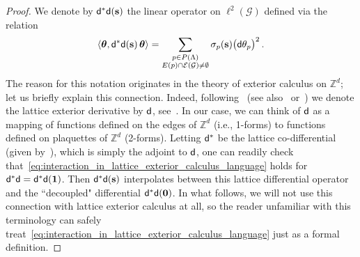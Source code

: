 \documentclass[11pt]{article}
\theoremstyle{definition}
\theoremstyle{remark}
\numberwithin{theorem}{section}
\newcommand{\bZ}{\mathbb Z}
\newcommand{\cE}{\mathcal{E}}
\begin{document}
    \begin{proof}
        We denote by ${\sf d}^\ast {\sf d}(\mathbf{s})$ the linear operator on $\ell^2(\mathcal{G})$ defined via the relation
        \begin{equation} \label{eq:interaction_in_lattice_exterior_calculus_language}
            \langle \boldsymbol{\theta}  , {\sf d}^\ast {\sf d}(\mathbf{s}) \, \boldsymbol{\theta} \rangle = \sum_{\substack{p\in P(\Lambda) \\ E(p)\cap \cE(\mathcal{G}) \not= \emptyset}}  \sigma_p(\mathbf{s}) \big({\sf d}\theta_p\big)^2 \, . 
        \end{equation}
        The reason for this notation originates in the theory of exterior calculus on $\bZ^d$; let us briefly explain this connection. Indeed, following~\cite[Section~10.1]{Cao-Sheffield-FGF-overview} (see also~\cite[Section~2.3]{Frohlich-Spencer} or~\cite[Section~2.2]{Garban-Sepulveda-IMRN2023}) we denote the lattice exterior derivative by ${\sf d}$, see~\cite[Definition~10.7]{Cao-Sheffield-FGF-overview}. In our case, we can think of ${\sf d}$ as a mapping of functions defined on the edges of $\bZ^d$ (i.e., 1-forms) to functions defined on plaquettes of $\bZ^d$ (2-forms). Letting ${\sf d}^\ast$ be the lattice co-differential (given by~\cite[Definition~10.10]{Cao-Sheffield-FGF-overview}), which is simply the adjoint to ${\sf d}$, one can readily check that~\eqref{eq:interaction_in_lattice_exterior_calculus_language} holds for ${\sf d^\ast d} = {\sf d^\ast d}(\mathbf{1})$. Then ${\sf d^\ast d}(\mathbf{s})$ interpolates between this lattice differential operator and the ``decoupled" differential ${\sf d^\ast d}(\mathbf{0})$. In what follows, we will not use this connection with lattice exterior calculus at all, so the reader unfamiliar with this terminology can safely treat~\eqref{eq:interaction_in_lattice_exterior_calculus_language} just as a formal definition.


\end{proof}
\end{document}
